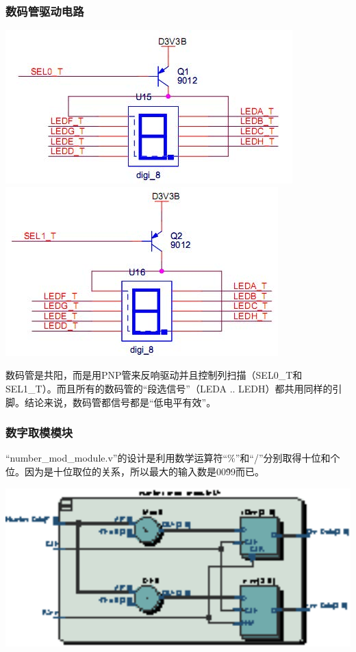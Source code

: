 \documentclass[12pt,a4paper]{article}
\begin{document}
	\subsubsection{数码管驱动电路}
		\begin{center}
			\includegraphics{pic/smg} \includegraphics{pic/smg2}
		\end{center}
		
	数码管是共阳，而是用PNP管来反响驱动并且控制列扫描（SEL0\_T和SEL1\_T）。而且所有的数码管的“段选信号”（LEDA .. LEDH）都共用同样的引脚。结论来说，数码管都信号都是“低电平有效”。
	\subsubsection{数字取模模块}
	“number\_mod\_module.v”的设计是利用数学运算符“\%”和“/”分别取得十位和个位。因为是十位取位的关系，所以最大的输入数是00\~99而已。
	
	\begin{center}
	\includegraphics[width=15cm]{pic/pdf/nummod.eps}
	\end{center}
\end{document}
